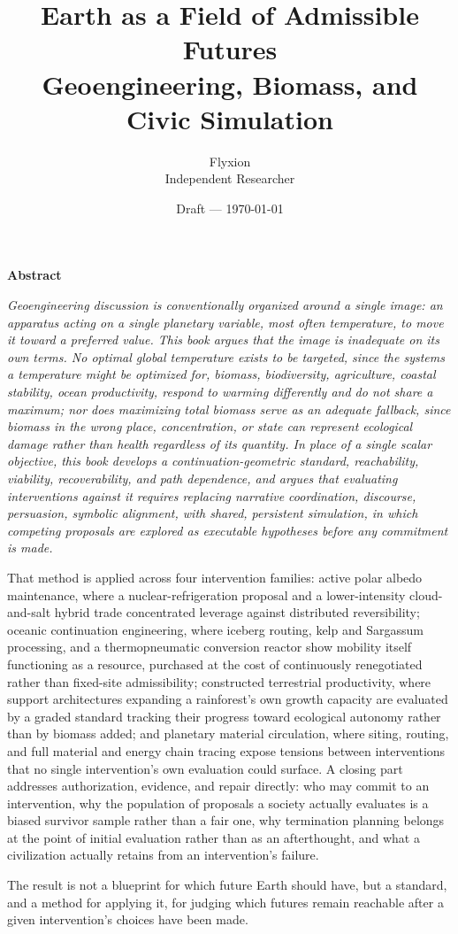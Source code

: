 \documentclass[11pt,oneside]{book}
\title{\textbf{Earth as a Field of Admissible Futures}\\[0.3em]
\large Geoengineering, Biomass, and Civic Simulation}
\author{Flyxion\\\normalsize Independent Researcher}
\date{Draft --- \today}
\newenvironment{abstract}
  {\clearpage\begin{center}\bfseries\large Abstract\end{center}\normalfont\itshape}
  {\clearpage}
\begin{document}
\maketitle

\begin{abstract}
Geoengineering discussion is conventionally organized around a single image: an apparatus acting on a single planetary variable, most often temperature, to move it toward a preferred value. This book argues that the image is inadequate on its own terms. No optimal global temperature exists to be targeted, since the systems a temperature might be optimized for, biomass, biodiversity, agriculture, coastal stability, ocean productivity, respond to warming differently and do not share a maximum; nor does maximizing total biomass serve as an adequate fallback, since biomass in the wrong place, concentration, or state can represent ecological damage rather than health regardless of its quantity. In place of a single scalar objective, this book develops a continuation-geometric standard, reachability, viability, recoverability, and path dependence, and argues that evaluating interventions against it requires replacing narrative coordination, discourse, persuasion, symbolic alignment, with shared, persistent simulation, in which competing proposals are explored as executable hypotheses before any commitment is made.

That method is applied across four intervention families: active polar albedo maintenance, where a nuclear-refrigeration proposal and a lower-intensity cloud-and-salt hybrid trade concentrated leverage against distributed reversibility; oceanic continuation engineering, where iceberg routing, kelp and Sargassum processing, and a thermopneumatic conversion reactor show mobility itself functioning as a resource, purchased at the cost of continuously renegotiated rather than fixed-site admissibility; constructed terrestrial productivity, where support architectures expanding a rainforest's own growth capacity are evaluated by a graded standard tracking their progress toward ecological autonomy rather than by biomass added; and planetary material circulation, where siting, routing, and full material and energy chain tracing expose tensions between interventions that no single intervention's own evaluation could surface. A closing part addresses authorization, evidence, and repair directly: who may commit to an intervention, why the population of proposals a society actually evaluates is a biased survivor sample rather than a fair one, why termination planning belongs at the point of initial evaluation rather than as an afterthought, and what a civilization actually retains from an intervention's failure.

The result is not a blueprint for which future Earth should have, but a standard, and a method for applying it, for judging which futures remain reachable after a given intervention's choices have been made.
\end{abstract}
\end{document}
